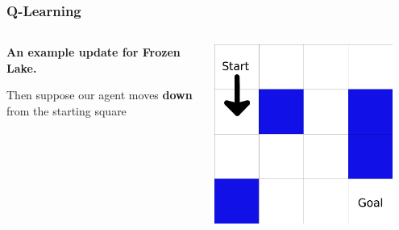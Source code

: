 \begin{frame}
\frametitle{Q-Learning}
  \begin{columns}
    \begin{column}{0.5\textwidth}
  \textbf{An example update for Frozen Lake.} 
  
    Then suppose our agent moves \textbf{down} from the starting square
    \end{column}
    \begin{column}{0.5\textwidth}
      \includegraphics[width=0.9\textwidth]{frozen-lake-arrow.png}
    \end{column}
  \end{columns}
\end{frame}

